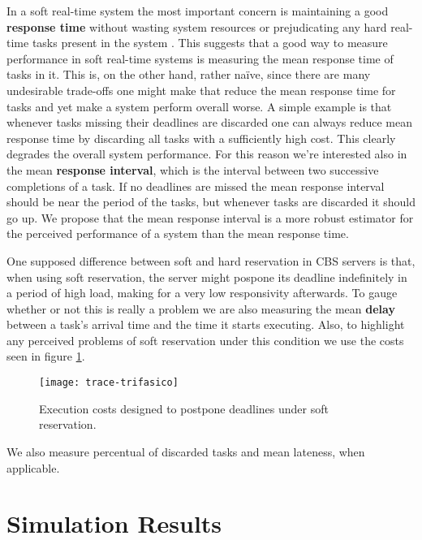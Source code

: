 \documentclass[times, 10pt,twocolumn]{article}
\begin{document}
In a soft real-time system the most important concern is maintaining a
good \textbf{response time} without wasting system resources or
prejudicating any hard real-time tasks present in the system
\cite{buttazzo05:soft}. This suggests that a good way to measure
performance in soft real-time systems is measuring the mean response
time of tasks in it. This is, on the other hand, rather naïve, since
there are many undesirable trade-offs one might make that reduce the
mean response time for tasks and yet make a system perform overall
worse. A simple example is that whenever tasks missing their deadlines
are discarded one can always reduce mean response time by discarding
all tasks with a sufficiently high cost. This clearly degrades the
overall system performance. For this reason we're interested also in
the mean \textbf{response interval}, which is the interval between two
successive completions of a task. If no deadlines are missed the mean
response interval should be near the period of the tasks, but whenever
tasks are discarded it should go up. We propose that the mean response
interval is a more robust estimator for the perceived performance of a
system than the mean response time.

One supposed difference between soft and hard reservation in CBS
servers is that, when using soft reservation, the server might pospone
its deadline indefinitely in a period of high load, making for a very
low responsivity afterwards. To gauge whether or not this is really a
problem we are also measuring the mean \textbf{delay} between a task's
arrival time and the time it starts executing. Also, to highlight any
perceived problems of soft reservation under this condition we use the
costs seen in figure \ref{fig:costs-trifasico}.

\begin{figure}[t]
  \centering
  \texttt{[image: trace-trifasico]}
  \caption{Execution costs designed to postpone deadlines under soft reservation.}
  \label{fig:costs-trifasico}
\end{figure}

We also measure percentual of discarded tasks and mean lateness, when
applicable.

\section{Simulation Results}
\label{sec:simulation-results}
\end{document}
